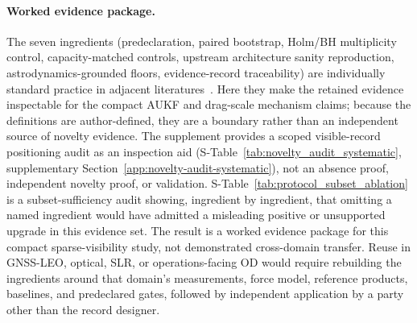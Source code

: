 \documentclass{article}
\begin{document}
\paragraph{Worked evidence package.}\label{sec:novelty-audit}\label{sec:protocol-prescription}
The seven ingredients (predeclaration, paired bootstrap, Holm/BH multiplicity control, capacity-matched controls, upstream architecture sanity reproduction, astrodynamics-grounded floors, evidence-record traceability) are individually standard practice in adjacent literatures~\cite{morris2019simulation,bouthillier2021accounting,dehghani2021benchmark,pineau2021reproducibility,semmelrock2025reproducibility,min2026transparency,ode2026protocol,yeo2020nistir}. Here they make the retained evidence inspectable for the compact AUKF and drag-scale mechanism claims; because the definitions are author-defined, they are a boundary rather than an independent source of novelty evidence. The supplement provides a scoped visible-record positioning audit as an inspection aid (S-Table~\ref{tab:novelty_audit_systematic}, supplementary Section~\ref{app:novelty-audit-systematic}), not an absence proof, independent novelty proof, or validation. S-Table~\ref{tab:protocol_subset_ablation} is a subset-sufficiency audit showing, ingredient by ingredient, that omitting a named ingredient would have admitted a misleading positive or unsupported upgrade in this evidence set. The result is a worked evidence package for this compact sparse-visibility study, not demonstrated cross-domain transfer. Reuse in GNSS-LEO, optical, SLR, or operations-facing OD would require rebuilding the ingredients around that domain's measurements, force model, reference products, baselines, and predeclared gates, followed by independent application by a party other than the record designer.


\end{document}
